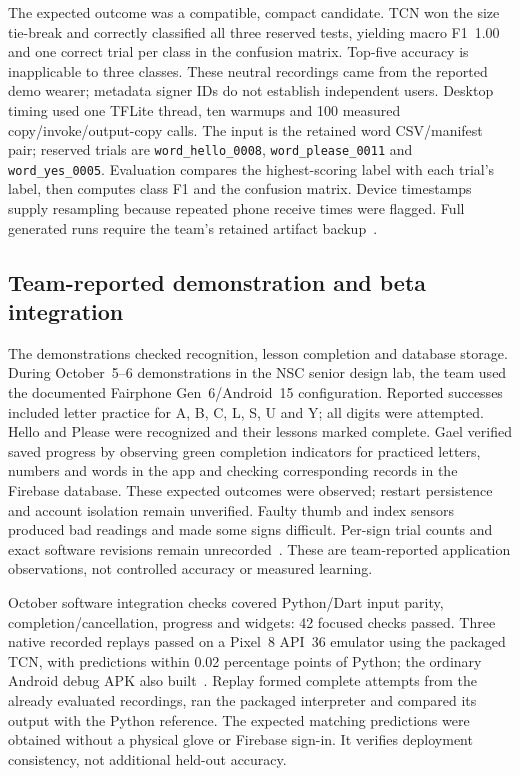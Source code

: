 \documentclass[11pt,letterpaper]{article}
\begin{document}
The expected outcome was a compatible, compact candidate. TCN won the size
tie-break and correctly classified all
three reserved tests, yielding macro F1~1.00 and one correct trial per class
in the confusion matrix. Top-five accuracy is inapplicable to three classes.
These neutral recordings came from the reported demo wearer; metadata signer
IDs do not establish independent users. Desktop timing used one TFLite thread,
ten warmups and 100 measured copy/invoke/output-copy calls. The input is the
retained word CSV/manifest pair; reserved
trials are \texttt{word\_hello\_0008}, \texttt{word\_please\_0011} and
\texttt{word\_yes\_0005}. Evaluation compares the highest-scoring label with
each trial's label, then computes class F1 and the confusion matrix. Device
timestamps supply resampling because repeated phone receive times were flagged.
Full generated runs require the team's retained artifact backup~\cite{wordrecord}.

\subsection{Team-reported demonstration and beta integration}
The demonstrations checked recognition, lesson completion and database storage.
During October~5--6 demonstrations in the NSC senior design lab, the team used
the documented Fairphone Gen~6/Android~15 configuration. Reported successes
included letter practice for A, B, C, L, S, U and Y; all digits were attempted.
Hello and Please were recognized and their lessons marked complete.
Gael verified saved progress by observing green completion indicators for
practiced letters, numbers and words in the app and checking corresponding
records in the Firebase database. These expected outcomes were observed;
restart persistence and account isolation remain unverified.
Faulty thumb and index sensors produced bad readings and made some signs
difficult. Per-sign trial counts and exact software revisions remain
unrecorded~\cite{demoobservations}. These are team-reported application
observations, not controlled accuracy or measured learning.

October software integration checks covered Python/Dart input parity,
completion/cancellation, progress and widgets: 42 focused checks passed.
Three native recorded replays passed on a Pixel~8 API~36 emulator using the
packaged TCN, with predictions within 0.02 percentage points of Python;
the ordinary Android debug APK also built~\cite{integration}. Replay formed
complete attempts from the already evaluated recordings, ran the packaged
interpreter and compared its output with the Python reference. The expected
matching predictions were obtained without a physical glove or Firebase sign-in.
It verifies deployment consistency, not additional held-out accuracy.
\end{document}
